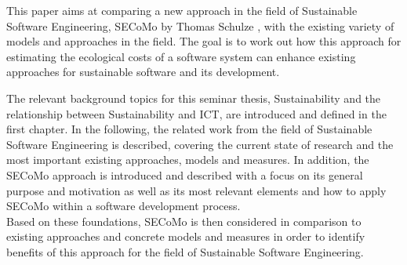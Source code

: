 This paper aims at comparing a new approach in the field of Sustainable Software Engineering, SECoMo by Thomas Schulze \cite{schulze_cost_2016}, with the existing variety of models and approaches in the field. The goal is to work out how this approach for estimating the ecological costs of a software system can enhance existing approaches for sustainable software and its development. %

The relevant background topics for this seminar thesis, Sustainability and the relationship between Sustainability and ICT,
are introduced and defined in the first chapter. In the following, the related work from the field of Sustainable Software Engineering is described, covering the current state of research and the most important existing approaches, models and measures. %
 In addition, the SECoMo approach is introduced %
and described with a focus on its general purpose and motivation as well as its most relevant elements and how to apply SECoMo within a software development process. %
\\ Based on these foundations, SECoMo is then considered in comparison to %
existing approaches and  concrete models and measures in order to identify benefits of this approach for the field of Sustainable Software Engineering.
